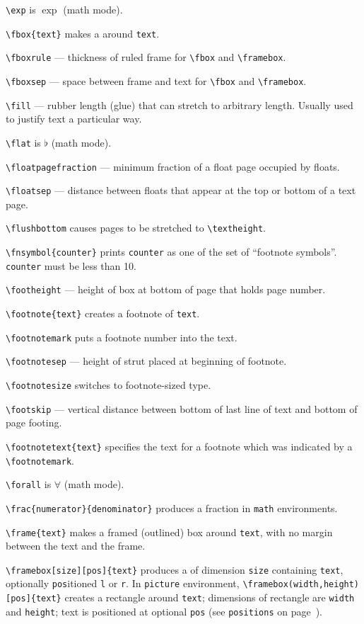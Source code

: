 \verb"\exp" is $\exp$ (math mode).

\verb"\fbox{text}" makes a  around \verb"text".

\verb"\fboxrule" --- thickness of ruled frame for \verb"\fbox" and
	\verb"\framebox".

\verb"\fboxsep" --- space between frame and text for \verb"\fbox" and
	\verb"\framebox".

\verb"\fill" --- rubber length (glue) that can stretch to arbitrary length.
	Usually used to justify text a particular way.

\verb"\flat" is $\flat$ (math mode).

\verb"\floatpagefraction" --- minimum fraction of a float page occupied by
	floats.

\verb"\floatsep" --- distance between floats that appear at the top
	or bottom of a text page.

\verb"\flushbottom" causes pages to be stretched to \verb"\textheight".

\verb"\fnsymbol{counter}" prints \verb"counter" as one of the set of
	``footnote symbols''.  \verb"counter" must be less than 10.

\verb"\footheight" --- height of box at bottom of page that holds page number.

\verb"\footnote{text}" creates a footnote of \verb"text".

\verb"\footnotemark" puts a footnote number into the text.

\verb"\footnotesep" --- height of strut placed at beginning of footnote.

\verb"\footnotesize" switches to footnote-sized type.

\verb"\footskip" --- vertical distance between bottom of last line of text
	and bottom of page footing.

\verb"\footnotetext{text}" specifies the text for a footnote which was
	indicated by a \verb"\footnotemark".

\verb"\forall" is $\forall$ (math mode).

\verb"\frac{numerator}{denominator}" produces a fraction in \verb"math"
	environments.

\verb"\frame{text}" makes a framed (outlined) box around \verb"text", with
	no margin between the text and the frame.

\verb"\framebox[size][pos]{text}" produces a  of dimension
	\verb"size" containing \verb"text", optionally \verb"pos"itioned
	\verb"l" or \verb"r". \ifsmallcrib \relax \else \linebreak \fi
	In \verb"picture" environment,
	\verb"\framebox(width,height)[pos]{text}" creates a rectangle
	around \verb"text"; dimensions of rectangle are \verb"width"
	and \verb"height";  text is positioned at optional \verb"pos"
	(see \verb"positions" on page~\pageref{pos-ref}).

